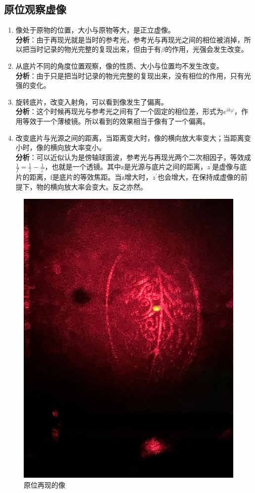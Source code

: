 \documentclass[a4paper]{article}
\begin{document}
\subsection{原位观察虚像}
\begin{enumerate}
    \item 像处于原物的位置，大小与原物等大，是正立虚像。
          \\\textbf{分析}：由于再现光就是当时的参考光，参考光与再现光之间的相位被消掉，所以把当时记录的物光完整的复现出来，但由于有$\beta$的作用，光强会发生改变。
    \item 从底片不同的角度位置观察，像的性质、大小与位置均不发生改变。
          \\\textbf{分析}：由于只是把当时记录的物光完整的复现出来，没有相位的作用，只有光强的变化。
    \item 旋转底片，改变入射角，可以看到像发生了偏离。
          \\\textbf{分析}：这个时候再现光与参考光之间有了一个固定的相位差，形式为$e^{ik\varphi}$，作用等效于一个薄棱镜。所以看到的效果相当于像有了一个偏离。
    \item 改变底片与光源之间的距离，当距离变大时，像的横向放大率变大；当距离变小时，像的横向放大率变小。
          \\\textbf{分析}：可以近似认为是傍轴球面波，参考光与再现光两个二次相因子，等效成$\frac{1}{f}=\frac{1}{z}-\frac{1}{z^\prime}$，也就是一个透镜。其中z是光源与底片之间的距离，$z^\prime$是虚像与底片的距离，f是底片的等效焦距。当z增大时，$z^\prime$也会增大，在保持成虚像的前提下，物的横向放大率会变大。反之亦然。
\end{enumerate}

\begin{figure}[H]
    \centering
    \captionsetup{justification=centering,margin=2cm}
    \includegraphics[width=.4\textwidth]{fig4.jpg}
    \caption{原位再现的像}
\end{figure}
\end{document}
